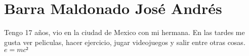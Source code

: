 \chapter{Barra Maldonado José Andrés}
Tengo 17 años, vio en la ciudad de Mexico con mi hermana. En las tardes me gusta ver peliculas, hacer ejercicio, jugar videojuegos y salir entre otras cosas.
$e=mc²$

